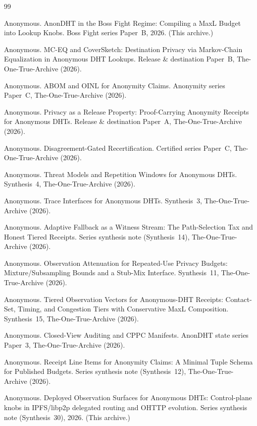 \documentclass[11pt]{article}
\begin{document}
\begin{thebibliography}{99}\small

Anonymous.
\newblock AnonDHT in the Boss Fight Regime: Compiling a MaxL Budget into Lookup Knobs.
\newblock Boss Fight series Paper~B, 2026. (This archive.)


Anonymous.
\newblock MC-EQ and CoverSketch: Destination Privacy via Markov-Chain Equalization in Anonymous DHT Lookups.
\newblock Release \& destination Paper~B, The-One-True-Archive (2026).

Anonymous.
\newblock ABOM and OINL for Anonymity Claims.
\newblock Anonymity series Paper~C, The-One-True-Archive (2026).

Anonymous.
\newblock Privacy as a Release Property: Proof-Carrying Anonymity Receipts for Anonymous DHTs.
\newblock Release \& destination Paper~A, The-One-True-Archive (2026).

Anonymous.
\newblock Disagreement-Gated Recertification.
\newblock Certified series Paper~C, The-One-True-Archive (2026).

Anonymous.
\newblock Threat Models and Repetition Windows for Anonymous DHTs.
\newblock Synthesis~4, The-One-True-Archive (2026).

Anonymous.
\newblock Trace Interfaces for Anonymous DHTs.
\newblock Synthesis~3, The-One-True-Archive (2026).


Anonymous.
\newblock Adaptive Fallback as a Witness Stream: The Path-Selection Tax and Honest Tiered Receipts.
\newblock Series synthesis note (Synthesis~14), The-One-True-Archive (2026).

Anonymous.
\newblock Observation Attenuation for Repeated-Use Privacy Budgets: Mixture/Subsampling Bounds and a Stub-Mix Interface.
\newblock Synthesis~11, The-One-True-Archive (2026).


Anonymous.
\newblock Tiered Observation Vectors for Anonymous-DHT Receipts: Contact-Set, Timing, and Congestion Tiers with Conservative MaxL Composition.
\newblock Synthesis~15, The-One-True-Archive (2026).

Anonymous.
\newblock Closed-View Auditing and CPPC Manifests.
\newblock AnonDHT state series Paper~3, The-One-True-Archive (2026).

Anonymous.
\newblock Receipt Line Items for Anonymity Claims: A Minimal Tuple Schema for Published Budgets.
\newblock Series synthesis note (Synthesis~12), The-One-True-Archive (2026).


Anonymous.
\newblock Deployed Observation Surfaces for Anonymous DHTs: Control-plane knobs in IPFS/libp2p delegated routing and OHTTP evolution.
\newblock Series synthesis note (Synthesis~30), 2026. (This archive.)

\end{thebibliography}
\end{document}
